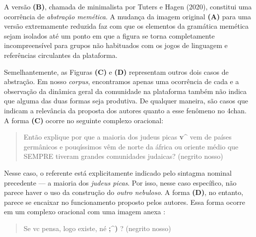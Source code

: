 \documentclass[portuguese]{textolivre}
\begin{document}
A versão \textbf{(B)}, chamada de minimalista por Tuters e Hagen (2020), constitui uma ocorrência de \emph{abstração memética}. A mudança da imagem original \textbf{(A)} para uma versão extremamente reduzida faz com que os elementos da gramática memética sejam isolados até um ponto em que a figura se torna completamente incompreensível para grupos não habituados com os jogos de linguagem e referências circulantes da plataforma. 

Semelhantemente, as Figuras \textbf{(C)} e \textbf{(D)} representam outros dois casos de abstração. Em nosso \emph{corpus}, encontramos apenas uma ocorrência de cada e a observação da dinâmica geral da comunidade na plataforma também não indica que alguma das duas formas seja produtiva. De qualquer maneira, são casos que indicam a relevância da proposta dos autores quanto a esse fenômeno no 4chan. A forma \textbf{(C)} ocorre no seguinte complexo oracional:

\begin{quote}
    Então explique por que a maioria dos judeus picas \textbf{v\textasciicircum{}} vem de países germânicos e pouqíssimos vêm de norte da áfrica ou oriente médio que SEMPRE tiveram grandes comunidades judaicas? (negrito nosso)
\end{quote}

Nesse caso, o referente está explicitamente indicado pelo sintagma nominal precedente –– a maioria dos \emph{judeus picas}. Por isso, nesse caso específico, não parece haver o uso da construção do \emph{outro nebuloso}. A forma \textbf{(D)}, no entanto, parece se encaixar no funcionamento proposto pelos autores. Essa forma ocorre em um complexo oracional com uma imagem anexa :

\begin{quote}
    Se vc pensa, logo existe, né \textbf{;\textasciicircum{})} ? (negrito nosso)
\end{quote}
\end{document}
